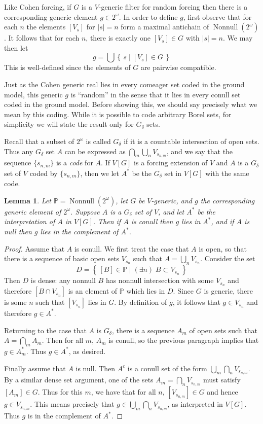 \documentclass[11pt,oneside,a4paper]{amsbook}
\newcommand{\set}[1]{\left\{\,#1\,\right\}}
\newcommand{\PP}{\mathbb P}
\DeclareMathOperator{\Nonnull}{Nonnull}
\theoremstyle{definition}
\theoremstyle{plain}
\newtheorem{lemma}[theorem]{Lemma}
\theoremstyle{definition}
\theoremstyle{remark}
\numberwithin{equation}{section}
\numberwithin{figure}{section}
\begin{document}
Like Cohen forcing, if $G$ is a $V$-generic filter for random forcing then there is a corresponding generic element $g\in2^\omega$. In order to define $g$, first observe that for each $n$ the elements $[V_s]$ for $|s|=n$ form a maximal antichain of $\Nonnull(2^\omega)$. It follows that for each $n$, there is exactly one $[V_s]\in G$ with $|s|=n$. We may then let
\[g=\bigcup\set{s\mid [V_s]\in G}
\]
This is well-defined since the elements of $G$ are pairwise compatible.

Just as the Cohen generic real lies in every comeager set coded in the ground model, this generic $g$ is ``random'' in the sense that it lies in every conull set coded in the ground model. Before showing this, we should say precisely what we mean by this coding. While it is possible to code arbitrary Borel sets, for simplicity we will state the result only for $G_\delta$ sets.

Recall that a subset of $2^\omega$ is called $G_\delta$ if it is a countable intersection of open sets. Thus any $G_\delta$ set $A$ can be expressed as $\bigcap_m\bigcup_nV_{s_{n,m}}$, and we say that the sequence $\{s_{n,m}\}$ is a \emph{code} for $A$. If $V[G]$ is a forcing extension of $V$ and $A$ is a $G_\delta$ set of $V$ coded by $\{s_{n,m}\}$, then we let $A^*$ be the $G_\delta$ set in $V[G]$ with the same code.

\begin{lemma}
  \label{lem:random-conull}
  Let $\PP=\Nonnull(2^\omega)$, let $G$ be $V$-generic, and $g$ the corresponding generic element of $2^\omega$. Suppose $A$ is a $G_\delta$ set of $V$, and let $A^*$ be the interpretation of $A$ in $V[G]$. Then if $A$ is conull then $g$ lies in $A^*$, and if $A$ is null then $g$ lies in the complement of $A^*$.
\end{lemma}

\begin{proof}
  Assume that $A$ is conull. We first treat the case that $A$ is open, so that there is a sequence of basic open sets $V_{s_n}$ such that $A=\bigcup_nV_{s_n}$. Consider the set
  \[D=\set{[B]\in\PP\mid (\exists n)\;B\subset V_{s_n}}
  \]
  Then $D$ is dense: any nonnull $B$ has nonnull intersection with some $V_{s_n}$ and therefore $[B\cap V_{s_n}]$ is an element of $\PP$ which lies in $D$. Since $G$ is generic, there is some $n$ such that $[V_{s_n}]$ lies in $G$. By definition of $g$, it follows that $g\in V_{s_n}$ and therefore $g\in A^*$.

  Returning to the case that $A$ is $G_\delta$, there is a sequence $A_m$ of open sets such that $A=\bigcap_mA_m$. Then for all $m$, $A_m$ is conull, so the previous paragraph implies that $g\in A_m^*$. Thus $g\in A^*$, as desired.

  Finally assume that $A$ is null. Then $A^c$ is a conull set of the form $\bigcup_m\bigcap_nV_{s_{n,m}}$. By a similar dense set argument, one of the sets $A_m=\bigcap_nV_{s_{n,m}}$ must satisfy $[A_m]\in G$. Thus for this $m$, we have that for all $n$, $[V_{s_{n,m}}]\in G$ and hence $g\in V_{s_{n,m}}$. This means precisely that $g\in\bigcup_m\bigcap_nV_{s_{n,m}}$, as interpreted in $V[G]$. Thus $g$ is in the complement of $A^*$.
\end{proof}
\end{document}
